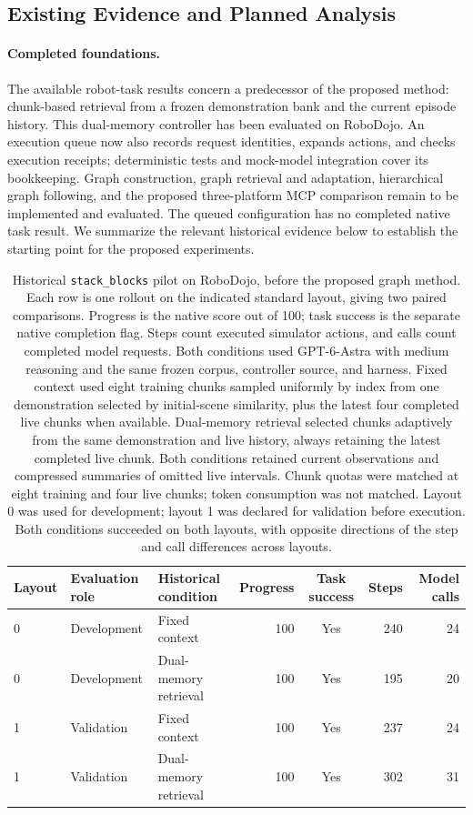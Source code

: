 \subsection{Existing Evidence and Planned Analysis}
\label{sec:evidence-analysis}

\paragraph{Completed foundations.}
The available robot-task results concern a predecessor of the proposed method: chunk-based retrieval from a frozen demonstration bank and the current episode history. This dual-memory controller has been evaluated on RoboDojo. An execution queue now also records request identities, expands actions, and checks execution receipts; deterministic tests and mock-model integration cover its bookkeeping. Graph construction, graph retrieval and adaptation, hierarchical graph following, and the proposed three-platform MCP comparison remain to be implemented and evaluated. The queued configuration has no completed native task result. We summarize the relevant historical evidence below to establish the starting point for the proposed experiments.

\begin{table}[t]
\centering
\small
\begin{tabular}{lllrcrr}
\toprule
Layout & Evaluation role & Historical condition & Progress & Task success & Steps & Model calls \\
\midrule
0 & Development & Fixed context & 100 & Yes & 240 & 24 \\
0 & Development & Dual-memory retrieval & 100 & Yes & 195 & 20 \\
1 & Validation & Fixed context & 100 & Yes & 237 & 24 \\
1 & Validation & Dual-memory retrieval & 100 & Yes & 302 & 31 \\
\bottomrule
\end{tabular}
\caption{Historical \texttt{stack\_blocks} pilot on RoboDojo, before the proposed graph method. Each row is one rollout on the indicated standard layout, giving two paired comparisons. Progress is the native score out of 100; task success is the separate native completion flag. Steps count executed simulator actions, and calls count completed model requests. Both conditions used GPT-6-Astra with medium reasoning and the same frozen corpus, controller source, and harness. Fixed context used eight training chunks sampled uniformly by index from one demonstration selected by initial-scene similarity, plus the latest four completed live chunks when available. Dual-memory retrieval selected chunks adaptively from the same demonstration and live history, always retaining the latest completed live chunk. Both conditions retained current observations and compressed summaries of omitted live intervals. Chunk quotas were matched at eight training and four live chunks; token consumption was not matched. Layout 0 was used for development; layout 1 was declared for validation before execution. Both conditions succeeded on both layouts, with opposite directions of the step and call differences across layouts.}
\label{tab:historical-pilot}
\end{table}

